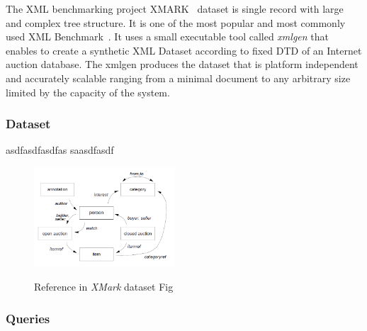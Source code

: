 The XML benchmarking project XMARK~\cite{xmark/original} dataset is single record with large and complex tree structure. It is one of the most popular and most commonly used XML Benchmark~\cite{xmark/mlynkova2008xml}. It uses a small executable tool called  \textit{xmlgen} that enables to create a synthetic XML Dataset according to fixed DTD of an Internet auction database. The xmlgen produces the dataset that is platform independent and accurately scalable ranging from a minimal document to any arbitrary size limited by the capacity of the system.

\subsubsection{Dataset}
\label{xmark-dataset}
asdfasdfasdfas saasdfasdf

\begin{figure}
	\centering
	\includegraphics[width=0.47\textwidth]{img/xmark-references.png}{
		\label{xmark-reference}
	}
	\caption{Reference in \textit{XMark} dataset Fig~\cite{xmark/original}}
	\label{figParseProcess}
\end{figure}

\subsubsection{Queries}
\label{xmark-queries}
